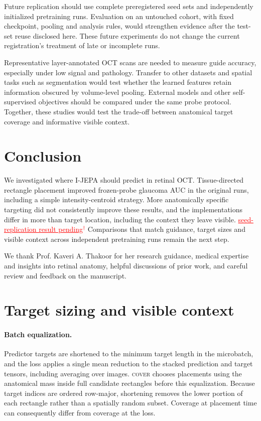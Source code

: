 \documentclass{article}
\newcommand{\ph}[1]{\textcolor{red}{\underline{#1}$^{\dagger}$}}
\newcommand{\CRSeedResultsPending}{\ph{seed-replication result pending}}
\begin{document}
Future replication should use complete preregistered seed sets and
independently initialized pretraining runs. Evaluation on
an untouched cohort, with fixed checkpoint, pooling and analysis rules,
would strengthen evidence after the test-set reuse disclosed here. These
future experiments do not change the current registration's treatment of
late or incomplete runs.

Representative layer-annotated OCT scans are needed to measure guide accuracy,
especially under low signal and pathology. Transfer to other datasets and
spatial tasks such as segmentation would test whether the learned features
retain information obscured by volume-level pooling. External models and
other self-supervised objectives should be compared under the same probe
protocol. Together, these studies would test the trade-off between anatomical
target coverage and informative visible context.

\section{Conclusion}

We investigated where I-JEPA should predict in retinal OCT.
Tissue-directed rectangle placement improved frozen-probe glaucoma AUC in
the original runs, including a simple intensity-centroid strategy.
More anatomically specific targeting did not consistently improve these
results, and the implementations differ in more than target location,
including the context they leave visible. \CRSeedResultsPending
Comparisons that match guidance, target sizes and visible context across
independent pretraining runs remain the next step.

\begin{ack}
We thank Prof. Kaveri A. Thakoor for her research guidance, medical expertise
and insights into retinal anatomy, helpful discussions of prior work, and
careful review and feedback on the manuscript.
\end{ack}




\appendix



\section{Target sizing and visible context}
\label{app:covbug}

\paragraph{Batch equalization.}
Predictor targets are shortened to the minimum target length in the
microbatch, and the loss applies a single mean reduction to the stacked
prediction and target tensors, including averaging over images.
\textsc{cover} chooses placements using the anatomical mass
inside full candidate rectangles before this equalization.
Because target indices are ordered row-major, shortening removes the
lower portion of each rectangle rather than a spatially random subset.
Coverage at placement time can consequently differ from coverage at the loss.
\end{document}
